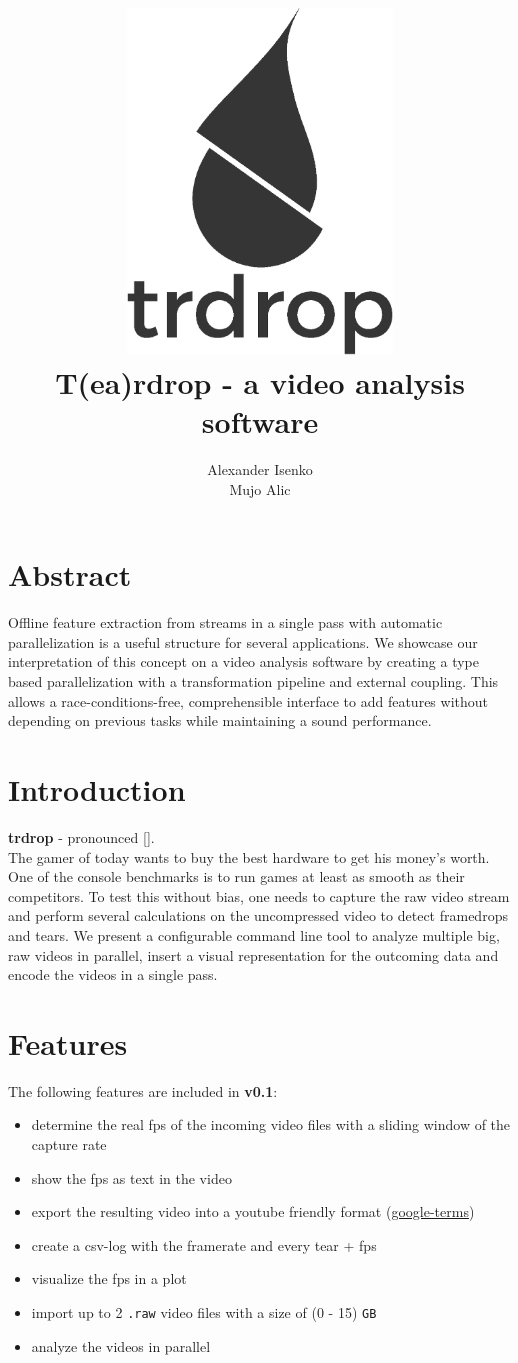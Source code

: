 \documentclass[titlepage]{article}
\title{\includegraphics[width=200pt, height=260pt]{../../images/trdrop_logo_text.eps} \\[50pt]
T(ea)rdrop - a video analysis software}
\author{Alexander Isenko\\Mujo Alic}
\date{}
\begin{document}
\maketitle

\newpage

\section{Abstract}
Offline feature extraction from streams in a single pass with automatic parallelization is a useful structure for several applications. We showcase our interpretation of this concept on a video analysis software by creating a type based parallelization with a transformation pipeline and external coupling. This allows a race-conditions-free, comprehensible interface to add features without depending on previous tasks while maintaining a sound performance.

\section{Introduction}

\textbf{trdrop} - pronounced [\textit{}]. \\[2mm]
\hfill
The gamer of today wants to buy the best hardware to get his money's worth. One of the console benchmarks is to run games at least as smooth as their competitors. To test this without bias, one needs to capture the raw video stream and perform several calculations on the uncompressed video to detect framedrops and tears. We present a configurable command line tool to analyze multiple big, raw videos in parallel, insert a visual representation for the outcoming data and encode the videos in a single pass. 

\section{Features}

The following features are included in \textbf{v0.1}:

\begin{itemize}
    \item determine the real fps of the incoming video files with a sliding window of the capture rate
    \item show the fps as text in the video
    \item export the resulting video into a youtube friendly format (\href{https://support.google.com/youtube/answer/1722171}{google-terms})
    \item create a csv-log with the framerate and every tear + fps
    \item visualize the fps in a plot
    \item import up to 2 \texttt{.raw} video files with a size of (0 - 15) \texttt{GB}
        \item analyze the videos in parallel
    
\end{itemize}
\end{document}
